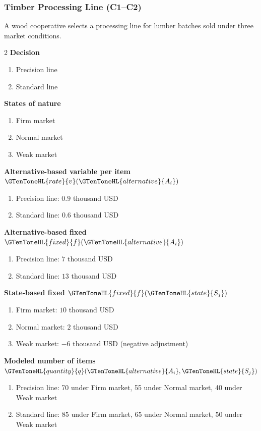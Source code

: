 	\subsubsection{Timber Processing Line (C1--C2)}
	\label{sec:problem31-timber-processing-line-c1-c2}
	A wood cooperative selects a processing line for lumber batches sold under three market conditions.
	\begin{multicols}{2}
	\textbf{Decision }
	\begin{enumerate}[label=\arabic*.]
\item Precision line
\item Standard line
	\end{enumerate}
	\textbf{States of nature}
	\begin{enumerate}[label=\arabic*.]
\item Firm market
\item Normal market
\item Weak market
	\end{enumerate}
	\columnbreak
	\textbf{Alternative-based variable  per item $\GTenToneHL{rate}{v}(\GTenToneHL{alternative}{A_i})$}
\begin{enumerate}[label=\arabic*.]
\item Precision line: $0.9$ thousand USD
\item Standard line: $0.6$ thousand USD\end{enumerate}
\textbf{Alternative-based fixed  $\GTenToneHL{fixed}{f}(\GTenToneHL{alternative}{A_i})$}
\begin{enumerate}[label=\arabic*.]
\item Precision line: $7$ thousand USD
\item Standard line: $13$ thousand USD\end{enumerate}
\textbf{State-based fixed  $\GTenToneHL{fixed}{f}(\GTenToneHL{state}{S_j})$}
\begin{enumerate}[label=\arabic*.]
\item Firm market: $10$ thousand USD
\item Normal market: $2$ thousand USD
\item Weak market: $-6$ thousand USD (negative adjustment)\end{enumerate}
\textbf{Modeled number of items $\GTenToneHL{quantity}{q}(\GTenToneHL{alternative}{A_i},\GTenToneHL{state}{S_j})$}
\begin{enumerate}[label=\arabic*.]
\item Precision line: 70 under Firm market, 55 under Normal market, 40 under Weak market
\item Standard line: 85 under Firm market, 65 under Normal market, 50 under Weak market
\end{enumerate}
	\end{multicols}


